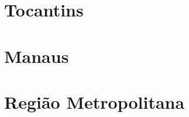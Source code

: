 \documentclass[8pt]{beamer}
\begin{document}
\begin{frame}[label=amzrrcnae2dig]{}
\textit{\hyperlink{indice_principal}{}}

\end{frame}

\section{Tocantins}


\begin{frame}[label=amztocod2dig]{}
\textit{\hyperlink{indice_principal}{}}

\end{frame}

\begin{frame}[label=amztocnae2dig]{}
\textit{\hyperlink{indice_principal}{}}

\end{frame}

\section{Manaus}


\begin{frame}[label=amzmanauscod2dig]{}
\textit{\hyperlink{indice_principal}{}}

\end{frame}

\begin{frame}[label=amzmanauscnae2dig]{}
\textit{\hyperlink{indice_principal}{}}

\end{frame}

\section{Região Metropolitana}


\begin{frame}[label=amzmetropolitanacod2dig]{}
\textit{\hyperlink{indice_principal}{}}

\end{frame}

\begin{frame}[label=amzmetropolitanacnae2dig]{}
\textit{\hyperlink{indice_principal}{}}

\end{frame}
\end{document}

